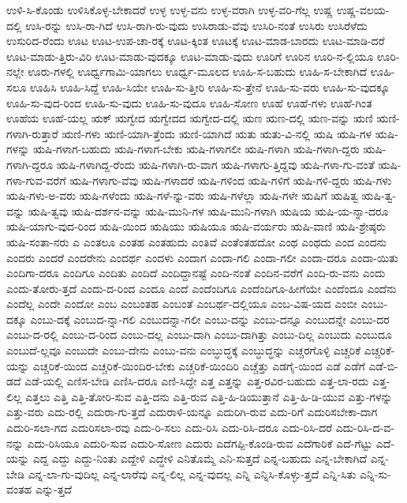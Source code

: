 {ಉಳಿ-ಸಿ-ಕೊಂಡು
ಉಳಿಸಿಕೊಳ್ಳ-ಬೇಕಾದರೆ
ಉಳ್ಳ
ಉಳ್ಳ-ವನು
ಉಳ್ಳ-ವರಾಗಿ
ಉಳ್ಳ-ವರಿ-ಗೆಲ್ಲ
ಉಷ್ಣ
ಉಷ್ಣ-ವಲಯ-ದಲ್ಲಿ
ಉಸಿ-ರನ್ನು
ಉಸಿ-ರಾ-ಗಿದೆ
ಉಸಿ-ರಾಗಿ-ರು-ವುದು
ಉಸಿರಾಡು-ವೆವು
ಉಸಿರಿ-ನಂತೆ
ಉಸಿರು
ಉಸಿರೆಳೆದು
ಉಸುರಿದ-ರೆಂದು
ಊಟ
ಊಟ-ಉಪ-ಚಾ-ರಕ್ಕೆ
ಊಟ-ಕ್ಕಿಂತ
ಊಟಕ್ಕೆ
ಊಟ-ಮಾಡ-ಬಾರದು
ಊಟ-ಮಾಡಿ-ದರೆ
ಊಟ-ಮಾಡು-ತ್ತಿರು-ವಿರಿ
ಊಟ-ಮಾಡು-ವುದಕ್ಕೂ
ಊಟ-ಮಾಡು-ವುದು
ಊರಿಗೆ
ಊರಿನ
ಊರಿ-ನ-ಲ್ಲಿಯೂ
ಊರಿ-ನಲ್ಲೇ
ಊರು-ಗಳಲ್ಲಿ
ಊರ್ಧ್ವಗಾಮಿ-ಯಾಗಲು
ಊರ್ಧ್ವ-ಮೂಲದ
ಊಹಿ-ಸ-ಬಹುದು
ಊಹಿ-ಸ-ಬೇಕಾಗಿದೆ
ಊಹಿ-ಸಲೂ
ಊಹಿಸಿ
ಊಹಿ-ಸಿದ್ದೆ
ಊಹಿ-ಸಿಯೇ
ಊಹಿ-ಸು-ತ್ತೀರಿ
ಊಹಿ-ಸು-ತ್ತೇನೆ
ಊಹಿ-ಸು-ವರು
ಊಹಿ-ಸು-ವುದಕ್ಕೂ
ಊಹಿ-ಸು-ವುದ-ರಿಂದ
ಊಹಿ-ಸು-ವುದು
ಊಹಿ-ಸು-ವುದೂ
ಊಹಿ-ಸೋಣ
ಊಹೆ
ಊಹೆ-ಗಳು
ಊಹೆ-ಗಿಂತ
ಊಹೆಯ
ಊಹೆ-ಯಲ್ಲ
ಋಕ್
ಋಗ್ವೇದ
ಋಗ್ವೇದದ
ಋಗ್ವೇದ-ದಲ್ಲಿ
ಋಣ
ಋಣ-ದಲ್ಲಿ
ಋಣ-ವನ್ನು
ಋಣಿ
ಋಣಿ-ಗಳಾಗಿ-ರುತ್ತಾರೆ
ಋಣಿ-ಗಳು
ಋಣಿ-ಯಾಗಿ-ತ್ತೆಂದು
ಋಣಿ-ಯಾಗಿದೆ
ಋತು
ಋತು-ವಿ-ನಲ್ಲಿ
ಋಷಿ
ಋಷಿ-ಗಳ
ಋಷಿ-ಗಳನ್ನು
ಋಷಿ-ಗಳಾಗ-ಬಹುದು
ಋಷಿ-ಗಳಾಗ-ಬೇಕು
ಋಷಿ-ಗಳಾಗಲೀ
ಋಷಿ-ಗಳಾಗಿ
ಋಷಿ-ಗಳಾಗಿ-ದ್ದರು
ಋಷಿ-ಗಳಾಗಿ-ದ್ದರೂ
ಋಷಿ-ಗಳಾಗಿದ್ದ-ರೆಂದು
ಋಷಿ-ಗಳಾಗಿ-ರು-ವಾಗ
ಋಷಿ-ಗಳಾಗು-ತ್ತಿದ್ದವು
ಋಷಿ-ಗಳಾ-ಗು-ವಂತೆ
ಋಷಿ-ಗಳಾ-ಗುವ-ವರೆಗೆ
ಋಷಿ-ಗಳಾಗು-ವೆವು
ಋಷಿ-ಗಳಾದರೆ
ಋಷಿ-ಗಳಿಂದ
ಋಷಿ-ಗಳಿಗೆ
ಋಷಿ-ಗಳಿ-ದ್ದರು
ಋಷಿ-ಗಳು
ಋಷಿ-ಗಳು-ಅ-ವರು
ಋಷಿ-ಗಳೆಂದು
ಋಷಿ-ಗಳೆ-ನ್ನು-ವರು
ಋಷಿ-ಗಳೆಲ್ಲಾ
ಋಷಿ-ಗಳೇ
ಋಷಿಗೆ
ಋಷಿತ್ವ
ಋಷಿ-ತ್ವ-ವನ್ನು
ಋಷಿ-ತ್ವವು
ಋಷಿ-ದರ್ಶನ-ವನ್ನು
ಋಷಿ-ಮುನಿ-ಗಳ
ಋಷಿ-ಮುನಿ-ಗಳಾಗಿ
ಋಷಿಯ
ಋಷಿ-ಯ-ನ್ನಾ-ದರೂ
ಋಷಿ-ಯಾಗು-ವುದ-ರಿಂದ
ಋಷಿ-ಯಿಂದ
ಋಷಿಯು
ಋಷಿಯೂ
ಋಷಿ-ವರ್ಯರು
ಋಷಿ-ವಾಣಿ
ಋಷಿ-ಶ್ರೇಷ್ಠರು
ಋಷಿ-ಸಂತಾ-ನರು
ಎ
ಎಂತಲೂ
ಎಂತಹ
ಎಂತಹುದು
ಎಂತಿವೆ
ಎಂತೆಂತಹದೋ
ಎಂಥ
ಎಂಥದು
ಎಂದ
ಎಂದನು
ಎಂದರು
ಎಂದರೆ
ಎಂದರೇನು
ಎಂದರ್ಥ
ಎಂದಳು
ಎಂದಾಗ
ಎಂದಾ-ಗಲಿ
ಎಂದಾ-ಗಲೀ
ಎಂದಾ-ದರೂ
ಎಂದಾ-ಯಿತು
ಎಂದಿಗಾ-ದರೂ
ಎಂದಿಗೂ
ಎಂದಿತು
ಎಂದಿದೆ
ಎಂದಿದ್ದಾನಷ್ಟೆ
ಎಂದಿ-ನಂತೆ
ಎಂದಿನ-ವರೆಗೆ
ಎಂದಿ-ರು-ವನು
ಎಂದು
ಎಂದು-ತೋರು-ತ್ತದೆ
ಎಂದು-ದ-ರಿಂದ
ಎಂದೂ
ಎಂದೆ
ಎಂದೆಂದಿಗೂ
ಎಂದೆಂದಿಗೂ-ಹೀಗೆಯೇ
ಎಂದೆಂದೂ
ಎಂದೆನು
ಎಂದೆಲ್ಲ
ಎಂದೇ
ಎಂದೋ
ಎಂಬ
ಎಂಬಂತಹ
ಎಂಬಂತೆ
ಎಂಬರ್ಥ-ದಲ್ಲಿಯೂ
ಎಂಬ-ವಿಷ-ಯದ
ಎಂಬೀ
ಎಂಬು-ದಕ್ಕೂ
ಎಂಬು-ದಕ್ಕೆ
ಎಂಬುದ-ನ್ನಾ-ಗಲಿ
ಎಂಬುದನ್ನಾ-ಗಲೀ
ಎಂಬು-ದನ್ನು
ಎಂಬು-ದನ್ನೂ
ಎಂಬುದನ್ನೇ
ಎಂಬು-ದರ
ಎಂಬು-ದ-ರಲ್ಲಿ
ಎಂಬು-ದ-ರಿಂದ
ಎಂಬು-ದಲ್ಲ
ಎಂಬು-ದಾಗಿ
ಎಂಬು-ದಾಗಿತ್ತು
ಎಂಬು-ದಿಲ್ಲ
ಎಂಬುದು
ಎಂಬುದೂ
ಎಂಬುದೆ-ಲ್ಲವೂ
ಎಂಬುದೇ
ಎಂಬು-ದೇನು
ಎಂಬು-ವನು
ಎಂಬ್ಧುದ್ಧಕ್ಕೆ
ಎಂಬ್ಧುದ್ಧನ್ನು
ಎಚ್ಚರಗೊಳ್ಳಿ
ಎಚ್ಚರಿಕೆ
ಎಚ್ಚರಿಕೆ-ಯನ್ನು
ಎಚ್ಚರಿಕೆ-ಯಿಂದ
ಎಚ್ಚರಿಕೆ-ಯಿಂದಿರ-ಬೇಕು
ಎಚ್ಚರಿಕೆ-ಯಿಂದಿರಿ
ಎಚ್ಚೆತ್ತು
ಎಡಗೈ-ಯಿಂದ
ಎಡೆ
ಎಡೆಗೆ
ಎಡೆ-ಬಿ-ಡದೆ
ಎಡೆ-ಯಲ್ಲಿ
ಎಣಿಸ-ಬೇಡಿ
ಎಣಿಸಿ-ದರೂ
ಎಣಿ-ಸಿದ್ದೇ
ಎತ್ತ
ಎತ್ತನ್ನು
ಎತ್ತ-ರವಿರ-ಬಹುದು
ಎತ್ತ-ಲಾ-ರದು
ಎತ್ತ-ಲಿಲ್ಲ
ಎತ್ತಲು
ಎತ್ತಿ
ಎತ್ತಿ-ತೋರಿ-ಸುವ
ಎತ್ತಿ-ದನು
ಎತ್ತಿ-ರುವ
ಎತ್ತಿ-ಹಿ-ಡಿಯುತ್ತಾನೆ
ಎತ್ತಿ-ಹಿ-ಡಿ-ಯುವ
ಎತ್ತು-ಗಳನ್ನು
ಎತ್ತು-ವರು
ಎದು-ರಲ್ಲಿ
ಎದುರಾ-ಗು-ತ್ತದೆ
ಎದುರಾಳಿ-ಯನ್ನೂ
ಎದುರಿಗಿ-ರುವ
ಎದು-ರಿಗೆ
ಎದುರಿಸಬೇಕಾ-ದಾಗ
ಎದುರಿ-ಸಲಾ-ಗದ
ಎದುರಿಸಲಾ-ರವು
ಎದು-ರಿ-ಸಲು
ಎದು-ರಿಸಿ
ಎದು-ರಿಸಿ-ದರೂ
ಎದು-ರಿಸಿ-ದರೆ
ಎದು-ರಿಸಿ-ದ-ವ-ನನ್ನು
ಎದು-ರಿಸಿಯೂ
ಎದುರಿ-ಸುವ
ಎದುರಿ-ಸೋಣ
ಎದುರು
ಎದೆಗಪ್ಪಿ-ಕೊಂಡಿ-ರುವ
ಎದೆಗಾರಿಕೆ
ಎದೆ-ಗೆಟ್ಟು
ಎದೆ-ಯನ್ನು
ಎದ್ದ
ಎದ್ದು
ಎದ್ದು-ನಿಂತು
ಎದ್ದೇಳಿ
ಎದ್ಧೇಳಿ
ಎನಿತೊಮ್ಮೆ
ಎನಿ-ಸುತ್ತದೆ
ಎನ್ನ-ಬಹುದು
ಎನ್ನ-ಬೇಕಾಗಿದೆ
ಎನ್ನ-ಬೇಡಿ
ಎನ್ನ-ಲಾ-ಗು-ವುದಿಲ್ಲ
ಎನ್ನ-ಲಾರೆವು
ಎನ್ನ-ಲಿಲ್ಲ
ಎನ್ನ-ವುದಲ್ಲ
ಎನ್ನಿ
ಎನ್ನಿಸಿ-ಕೊಳ್ಳು-ತ್ತದೆ
ಎನ್ನಿ-ಸಿತು
ಎನ್ನಿ-ಸು-ವಂತಹ
ಎನ್ನು-ತ್ತದೆ
}
